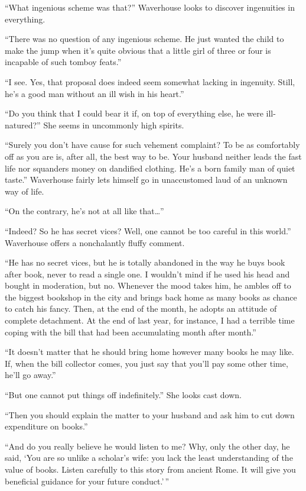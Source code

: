 \documentclass{book}
\begin{document}
``What ingenious scheme was that?'' Waverhouse looks to discover
ingenuities in everything.

``There was no question of any ingenious scheme. He just wanted the
child to make the jump when it's quite obvious that a little girl of
three or four is incapable of such tomboy feats.''

``I see. Yes, that proposal does indeed seem somewhat lacking in
ingenuity. Still, he's a good man without an ill wish in his heart.''

``Do you think that I could bear it if, on top of everything else, he
were ill-natured?'' She seems in uncommonly high spirits.

``Surely you don't have cause for such vehement complaint? To be as
comfortably off as you are is, after all, the best way to be. Your
husband neither leads the fast life nor squanders money on dandified
clothing. He's a born family man of quiet taste.'' Waverhouse fairly
lets himself go in unaccustomed laud of an unknown way of life.

``On the contrary, he's not at all like that\ldots{}''

``Indeed? So he has secret vices? Well, one cannot be too careful in
this world.'' Waverhouse offers a nonchalantly fluffy comment.

``He has no secret vices, but he is totally abandoned in the way he buys
book after book, never to read a single one. I wouldn't mind if he used
his head and bought in moderation, but no. Whenever the mood takes him,
he ambles off to the biggest bookshop in the city and brings back home
as many books as chance to catch his fancy. Then, at the end of the
month, he adopts an attitude of complete detachment. At the end of last
year, for instance, I had a terrible time coping with the bill that had
been accumulating month after month.''

``It doesn't matter that he should bring home however many books he may
like. If, when the bill collector comes, you just say that you'll pay
some other time, he'll go away.''

``But one cannot put things off indefinitely.'' She looks cast down.

``Then you should explain the matter to your husband and ask him to cut
down expenditure on books.''

``And do you really believe he would listen to me? Why, only the other
day, he said, `You are so unlike a scholar's wife: you lack the least
understanding of the value of books. Listen carefully to this story from
ancient Rome. It will give you beneficial guidance for your future
conduct.'\,''
\end{document}
